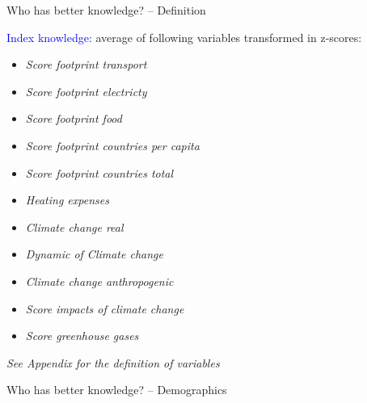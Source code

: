 \begin{framefont}{\small}
\begin{frame}{Who has better knowledge? -- Definition}
 \begin{center}
     {\textcolor{blue}{Index knowledge:} average of following variables transformed in z-scores:}
\begin{multicols}{2}
\begin{itemize}
	\item {\scriptsize \textit{Score footprint transport}}
	\item  {\scriptsize  \textit{Score footprint electricty}}
	\item  {\scriptsize \textit{Score footprint food}}
	\item {\scriptsize  \textit{Score footprint countries per capita}}
	\item  {\scriptsize \textit{Score footprint countries total}}
	\item  {\scriptsize \textit{Heating expenses}}
	\item  {\scriptsize \textit{Climate change real}}
	\item  {\scriptsize \textit{Dynamic of Climate change}}
	\item  {\scriptsize \textit{Climate change anthropogenic}}
	\item {\scriptsize \textit{Score impacts of climate change}}
	\item {\scriptsize \textit{Score greenhouse gases}}
\end{itemize}
\end{multicols}
\vspace{1.5cm}
 \end{center}
{\scriptsize \textit{See Appendix for the definition of variables}}
\end{frame}



\begin{frame}{Who has better knowledge? -- Demographics}


\end{frame}
\end{framefont}
